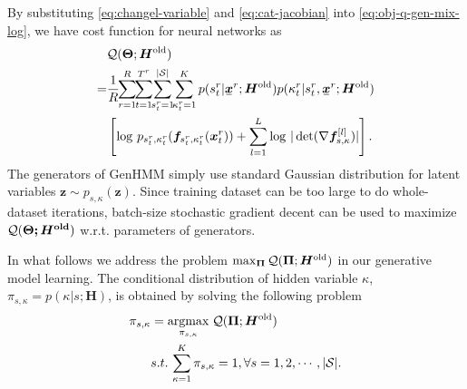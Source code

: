\documentclass{ecai}
\newcommand{\ubar}[1]{\mkern2mu\underline{\mkern-2mu #1\mkern-2mu}\mkern2mu}
\newcommand{\ubmr}[2]{\ubar{\bm{#1}}^{#2}}
\newcommand{\bmtr}[3]{\bm{#1}^{#3}_{#2}}
\newcommand{\smtr}[3]{{#1}^{#3}_{#2}}
\begin{document}
By substituting \eqref{eq:changel-variable} and \eqref{eq:cat-jacobian} into \eqref{eq:obj-q-gen-mix-log}, we have cost function for neural networks as
\begin{align}\label{eq:obj-q-gen-mix}
  &\Qq(\bm{\Theta}; \bm{H}^{\mathrm{old}}) \nonumber \\
  =& \frac{1}{R}\hspace{-3pt}\sum_{r=1}^{R}\hspace{-3pt} \sum_{t=1}^{{T}^{r}}\hspace{-3pt} \sum_{\smtr{s}{t}{r}=1}^{|\Ss|} \hspace{-3pt} \sum_{\smtr{\kappa}{t}{r}=1}^{K}p(\smtr{s}{t}{r}| \ubmr{x}{r}; \bm{H}^{\mathrm{old}})p(\smtr{\kappa}{t}{r}|\smtr{s}{t}{r}, \ubmr{x}{r}; \bm{H}^{\mathrm{old}}) \nonumber\\
  &\left[ \log\, p_{\smtr{s}{t}{r}, \smtr{\kappa}{t}{r}}(\bm{f}_{\smtr{s}{t}{r}, \smtr{\kappa}{t}{r}}(\bmtr{x}{t}{r})) + \sum_{l=1}^{L}\log\,| \det (\nabla{\bm{f}_{s,\kappa}^{[l]}})|\right].
\end{align}
The generators of GenHMM simply use standard Gaussian distribution for latent variables $\bm{z} \sim p_{s,\kappa}(\bm{z})$. Since training dataset can be too large to do whole-dataset iterations, batch-size stochastic gradient decent can be used to maximize $\mathcal{Q}(\bm{\Theta; \bm{H}^{\mathrm{old}}})$ w.r.t. parameters of generators.

In what follows we address the problem $\max_{\bm{\Pi}} \mathcal{Q}(\bm{\Pi}; \bm{H}^{\mathrm{old}})$ in our generative model learning. The conditional distribution of hidden variable $\kappa$, $\pi_{s, \kappa} = p(\kappa | s; \bm{H})$, is obtained by solving the following problem
\begin{align}\label{opm:pi}
  \pi_{s, \kappa} & = \underset{\pi_{s, \kappa}}{\operatorname{argmax}}\; \mathcal{Q}(\bm{\Pi}; \bm{H}^{\mathrm{old}}) \\ \nonumber
                  & s.t. \, \sum_{\kappa=1}^{K} \pi_{s, \kappa}= 1, \forall s = 1, 2, \cdots, |\mathcal{S}|. 
\end{align}
\end{document}
